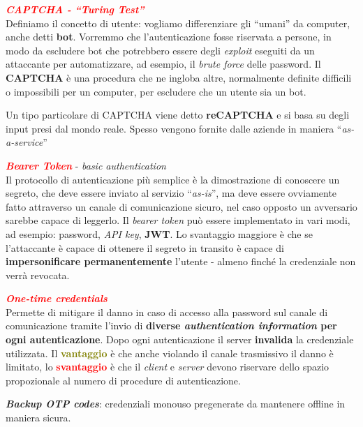 \begin{boxA}
    \textcolor{red}{\textbf{\textit{CAPTCHA - ``Turing Test''}}} \\
    Definiamo il concetto di utente: vogliamo differenziare gli ``umani'' da computer, anche detti \textbf{bot}. Vorremmo che l'autenticazione fosse riservata a persone, in modo da escludere bot che potrebbero essere degli \textit{exploit} eseguiti da un attaccante per automatizzare, ad esempio, il \textit{brute force} delle password. Il \textbf{CAPTCHA} è una procedura che ne ingloba altre, normalmente definite difficili o impossibili per un computer, per escludere che un utente sia un bot.

    \smallskip

    Un tipo particolare di CAPTCHA viene detto \textbf{reCAPTCHA} e si basa su degli input presi dal mondo reale. Spesso vengono fornite dalle aziende in maniera ``\textit{as-a-service}''
\end{boxA}

\begin{flushleft}
    \textcolor{red}{\textbf{\textit{Bearer Token}}} - \textit{basic authentication} \\
    Il protocollo di autenticazione più semplice è la dimostrazione di conoscere un segreto, che deve essere inviato al servizio ``\textit{as-is}'', ma deve essere ovviamente fatto attraverso un canale di comunicazione sicuro, nel caso opposto un avversario sarebbe capace di leggerlo. Il \textit{bearer token} può essere implementato in vari modi, ad esempio: password, \textit{API key}, \textbf{JWT}. Lo svantaggio maggiore è che se l'attaccante è capace di ottenere il segreto in transito è capace di \textbf{impersonificare permanentemente} l'utente - almeno finché la credenziale non verrà revocata.
\end{flushleft}

\begin{flushleft}
    \textcolor{red}{\textbf{\textit{One-time credentials}}} \\
    Permette di mitigare il danno in caso di accesso alla password sul canale di comunicazione tramite l'invio di \textbf{diverse \textit{authentication information} per ogni autenticazione}. Dopo ogni autenticazione il server \textbf{invalida} la credenziale utilizzata. Il \textcolor{olive}{\textbf{vantaggio}} è che anche violando il canale trasmissivo il danno è limitato, lo \textcolor{red}{\textbf{svantaggio}} è che il \textit{client} e \textit{server} devono riservare dello spazio propozionale al numero di procedure di autenticazione.
    
    \smallskip

    \textbf{\textit{Backup OTP codes}}: credenziali monouso pregenerate da mantenere offline in maniera sicura.
\end{flushleft}

